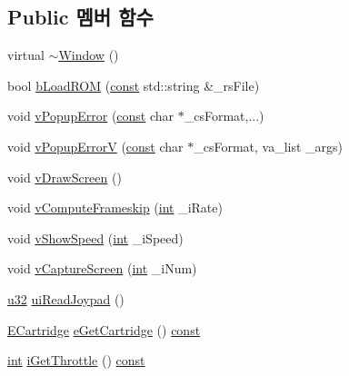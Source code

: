 \subsection*{Public 멤버 함수}
\begin{DoxyCompactItemize}
\item 
virtual \mbox{\hyperlink{class_v_b_a_1_1_window_a3bf5880da605d1190d685a4f7796ca51}{$\sim$\+Window}} ()
\item 
bool \mbox{\hyperlink{class_v_b_a_1_1_window_a69ddb41bd29d9f0db04175671ff2e2f4}{b\+Load\+R\+OM}} (\mbox{\hyperlink{getopt1_8c_a2c212835823e3c54a8ab6d95c652660e}{const}} std\+::string \&\+\_\+rs\+File)
\item 
void \mbox{\hyperlink{class_v_b_a_1_1_window_afde18894816458e195f561b03ee2898c}{v\+Popup\+Error}} (\mbox{\hyperlink{getopt1_8c_a2c212835823e3c54a8ab6d95c652660e}{const}} char $\ast$\+\_\+cs\+Format,...)
\item 
void \mbox{\hyperlink{class_v_b_a_1_1_window_a1f89a108839ea022393c56782dde0f60}{v\+Popup\+ErrorV}} (\mbox{\hyperlink{getopt1_8c_a2c212835823e3c54a8ab6d95c652660e}{const}} char $\ast$\+\_\+cs\+Format, va\+\_\+list \+\_\+args)
\item 
void \mbox{\hyperlink{class_v_b_a_1_1_window_af82e47600303a15b2aa4fdffb90df394}{v\+Draw\+Screen}} ()
\item 
void \mbox{\hyperlink{class_v_b_a_1_1_window_abcfa3555126b7804609a8438ece3266e}{v\+Compute\+Frameskip}} (\mbox{\hyperlink{_util_8cpp_a0ef32aa8672df19503a49fab2d0c8071}{int}} \+\_\+i\+Rate)
\item 
void \mbox{\hyperlink{class_v_b_a_1_1_window_acf7f6aac9ae790353c5c61e7afa3515e}{v\+Show\+Speed}} (\mbox{\hyperlink{_util_8cpp_a0ef32aa8672df19503a49fab2d0c8071}{int}} \+\_\+i\+Speed)
\item 
void \mbox{\hyperlink{class_v_b_a_1_1_window_a68341ae65a5ec41c6e6269d6f579aa08}{v\+Capture\+Screen}} (\mbox{\hyperlink{_util_8cpp_a0ef32aa8672df19503a49fab2d0c8071}{int}} \+\_\+i\+Num)
\item 
\mbox{\hyperlink{_system_8h_a10e94b422ef0c20dcdec20d31a1f5049}{u32}} \mbox{\hyperlink{class_v_b_a_1_1_window_ad5768e6fccecbcc761de003ae915684b}{ui\+Read\+Joypad}} ()
\item 
\mbox{\hyperlink{class_v_b_a_1_1_window_af580451d3ee7a738a73434858a08fa65}{E\+Cartridge}} \mbox{\hyperlink{class_v_b_a_1_1_window_aed86700e3c983d6858c24e48eea48710}{e\+Get\+Cartridge}} () \mbox{\hyperlink{getopt1_8c_a2c212835823e3c54a8ab6d95c652660e}{const}}
\item 
\mbox{\hyperlink{_util_8cpp_a0ef32aa8672df19503a49fab2d0c8071}{int}} \mbox{\hyperlink{class_v_b_a_1_1_window_a1f6599f43eda534897aa9aea53a840a0}{i\+Get\+Throttle}} () \mbox{\hyperlink{getopt1_8c_a2c212835823e3c54a8ab6d95c652660e}{const}}
\end{DoxyCompactItemize}
